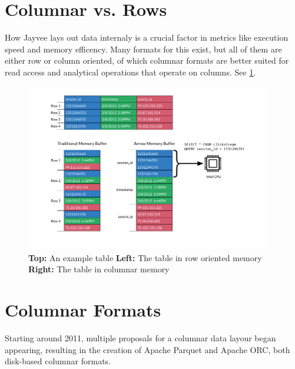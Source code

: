\section{Columnar vs. Rows}
\label{section:column_vs_row}
How Jayvee lays out data internaly is a crucial factor in metrics like execution speed and memory efficency.
Many formats for this exist, but all of them are either row or column oriented, of which columnar formats are better suited for read access and analytical operations that operate on columns. \autocite{Floratou2019}
See \ref{fig:row_v_col}.
\begin{figure}
	\begin{center}
		\includegraphics[width=0.95\textwidth]{resources/columnar}
	\end{center}
	\caption{\textbf{Top:} An example table \textbf{Left:} The table in row oriented memory \textbf{Right:} The table in columnar memory}
	\label{fig:row_v_col}
\end{figure}


\section{Columnar Formats}
\label{section:columnar}
Starting around 2011, multiple proposals for a columnar data layour began appearing, resulting in the creation of Apache Parquet and Apache ORC, both disk-based columnar formats.

